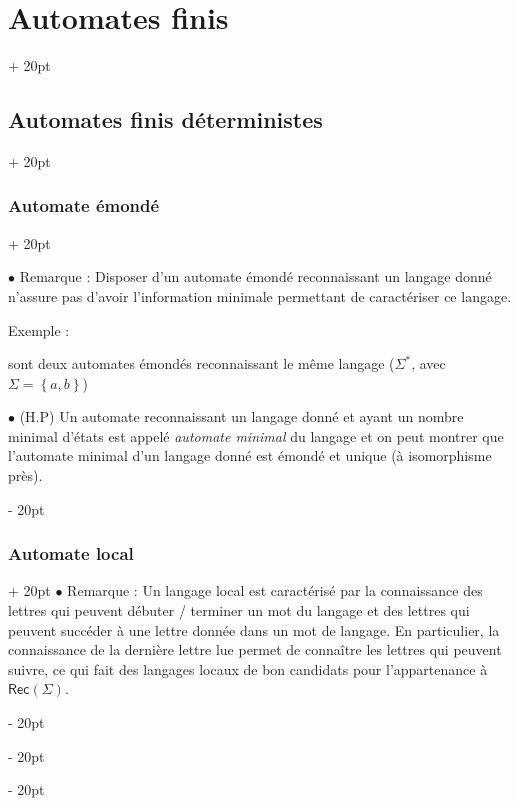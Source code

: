 \documentclass[a4paper, 12pt, twoside]{article}
\newcommand{\lr}[1]{\left( #1 \right)}
\newcommand{\set}[1]{\left\{ #1 \right\}}
\newcommand{\ind}[1][20pt]{\advance\leftskip + #1}
\newcommand{\deind}[1][20pt]{\advance\leftskip - #1}
\newenvironment{indt}[2][20pt]{#2 \par \ind[#1]}{\par \deind} %
\newcommand{\Rec}[1]{\mathsf{Rec}\!\lr{#1}}
\begin{document}
\begin{indt}{\section{Automates finis}}
\begin{indt}{\subsection{Automates finis déterministes}}
\begin{indt}{\subsubsection{Automate émondé}}
                \vspace{12pt}
                
                $\bullet$ Remarque : Disposer d'un automate émondé reconnaissant un langage donné n'assure pas d'avoir l'information minimale permettant de caractériser ce langage.

                Exemple :

                \begin{center}
                \end{center}

                sont deux automates émondés reconnaissant le même langage ($\Sigma^*$, avec $\Sigma = \set{a, b}$)

                \vspace{12pt}
                
                $\bullet$ (H.P) Un automate reconnaissant un langage donné et ayant un nombre minimal d'états est appelé \emph{automate minimal} du langage et on peut montrer que l'automate minimal d'un langage donné est émondé et unique (à isomorphisme près).
            \end{indt}

            \vspace{12pt}
            
            \begin{indt}{\subsubsection{Automate local}}
                $\bullet$ Remarque :
                Un langage local est caractérisé par la connaissance des lettres qui peuvent débuter / terminer un mot du langage et des lettres qui peuvent succéder à une lettre donnée dans un mot de langage. En particulier, la connaissance de la dernière lettre lue permet de connaître les lettres qui peuvent suivre, ce qui fait des langages locaux de bon candidats pour l'appartenance à $\Rec \Sigma$.


\end{indt}
\end{indt}
\end{indt}
\end{document}
